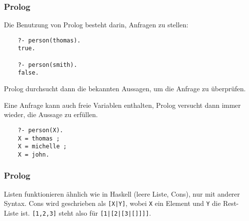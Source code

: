 \documentclass{beamer}
\begin{document}
\begin{frame}[fragile]
  \frametitle{Prolog}
  Die Benutzung von Prolog besteht darin, Anfragen zu stellen:
  \begin{lstlisting}
    ?- person(thomas).
    true.
    
    ?- person(smith).
    false.
  \end{lstlisting}
  Prolog durchsucht dann die bekannten Aussagen, um die Anfrage zu überprüfen.
  
  Eine Anfrage kann auch freie Variablen enthalten,
  Prolog versucht dann immer wieder, die Aussage zu erfüllen.
  \begin{lstlisting}
    ?- person(X).
    X = thomas ;
    X = michelle ;
    X = john.
  \end{lstlisting}
\end{frame}

\begin{frame}[fragile]
  \frametitle{Prolog}
  Listen funktionieren ähnlich wie in Haskell (leere Liste, Cons), nur mit anderer Syntax.
  Cons wird geschrieben als \lstinline{[X|Y]}, wobei \lstinline{X} ein Element und \lstinline{Y} die Rest-Liste ist.
  \lstinline{[1,2,3]} steht also für \lstinline{[1|[2|[3|[]]]]}.
\end{frame}
\end{document}

